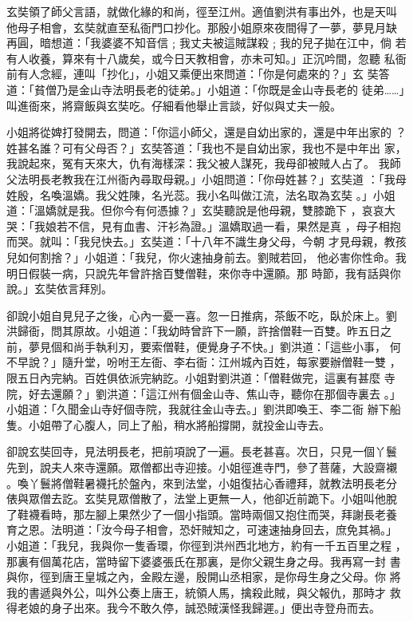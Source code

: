 \begin{pinyinscope}
{玄奘領了師父言語，就做化緣的和尚，徑至江州。適值劉洪有事出外，也是天叫
他母子相會，玄奘就直至私衙門口抄化。那殷小姐原來夜間得了一夢，夢見月缺
再圓，暗想道：「我婆婆不知音信﹔我丈夫被這賊謀殺﹔我的兒子拋在江中，倘
若有人收養，算來有十八歲矣，或今日天教相會，亦未可知。」正沉吟間，忽聽
私衙前有人念經，連叫「抄化」，小姐又乘便出來問道：「你是何處來的？」玄
奘答道：「貧僧乃是金山寺法明長老的徒弟。」小姐道：「你既是金山寺長老的
徒弟……」叫進衙來，將齋飯與玄奘吃。仔細看他舉止言談，好似與丈夫一般。

小姐將從婢打發開去，問道：「你這小師父，還是自幼出家的，還是中年出家的
？姓甚名誰？可有父母否？」玄奘答道：「我也不是自幼出家，我也不是中年出
家，我說起來，冤有天來大，仇有海樣深：我父被人謀死，我母卻被賊人占了。
我師父法明長老教我在江州衙內尋取母親。」小姐問道：「你母姓甚？」玄奘道
：「我母姓殷，名喚溫嬌。我父姓陳，名光蕊。我小名叫做江流，法名取為玄奘
。」小姐道：「溫嬌就是我。但你今有何憑據？」玄奘聽說是他母親，雙膝跪下
，哀哀大哭：「我娘若不信，見有血書、汗衫為證。」溫嬌取過一看，果然是真
，母子相抱而哭。就叫：「我兒快去。」玄奘道：「十八年不識生身父母，今朝
才見母親，教孩兒如何割捨？」小姐道：「我兒，你火速抽身前去。劉賊若回，
他必害你性命。我明日假裝一病，只說先年曾許捨百雙僧鞋，來你寺中還願。那
時節，我有話與你說。」玄奘依言拜別。

卻說小姐自見兒子之後，心內一憂一喜。忽一日推病，茶飯不吃，臥於床上。劉
洪歸衙，問其原故。小姐道：「我幼時曾許下一願，許捨僧鞋一百雙。昨五日之
前，夢見個和尚手執利刃，要索僧鞋，便覺身子不快。」劉洪道：「這些小事，
何不早說？」隨升堂，吩咐王左衙、李右衙：江州城內百姓，每家要辦僧鞋一雙
，限五日內完納。百姓俱依派完納訖。小姐對劉洪道：「僧鞋做完，這裏有甚麼
寺院，好去還願？」劉洪道：「這江州有個金山寺、焦山寺，聽你在那個寺裏去
。」小姐道：「久聞金山寺好個寺院，我就往金山寺去。」劉洪即喚王、李二衙
辦下船隻。小姐帶了心腹人，同上了船，稍水將船撐開，就投金山寺去。

卻說玄奘回寺，見法明長老，把前項說了一遍。長老甚喜。次日，只見一個丫鬟
先到，說夫人來寺還願。眾僧都出寺迎接。小姐徑進寺門，參了菩薩，大設齋襯
。喚丫鬟將僧鞋暑襪托於盤內，來到法堂，小姐復拈心香禮拜，就教法明長老分
俵與眾僧去訖。玄奘見眾僧散了，法堂上更無一人，他卻近前跪下。小姐叫他脫
了鞋襪看時，那左腳上果然少了一個小指頭。當時兩個又抱住而哭，拜謝長老養
育之恩。法明道：「汝今母子相會，恐奸賊知之，可速速抽身回去，庶免其禍。」
小姐道：「我兒，我與你一隻香環，你徑到洪州西北地方，約有一千五百里之程
，那裏有個萬花店，當時留下婆婆張氏在那裏，是你父親生身之母。我再寫一封
書與你，徑到唐王皇城之內，金殿左邊，殷開山丞相家，是你母生身之父母。你
將我的書遞與外公，叫外公奏上唐王，統領人馬，擒殺此賊，與父報仇，那時才
救得老娘的身子出來。我今不敢久停，誠恐賊漢怪我歸遲。」便出寺登舟而去。

}
\end{pinyinscope}
